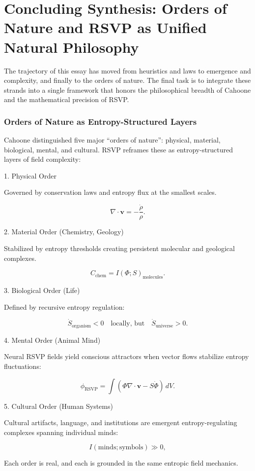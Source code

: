 \documentclass[12pt]{book}
\begin{document}
\chapter{Concluding Synthesis: Orders of Nature and RSVP as Unified Natural Philosophy}
The trajectory of this essay has moved from heuristics and laws to emergence and complexity, and finally to the orders of nature. The final task is to integrate these strands into a single framework that honors the philosophical breadth of Cahoone and the mathematical precision of RSVP.

\subsection{Orders of Nature as Entropy-Structured Layers}
Cahoone distinguished five major “orders of nature”: physical, material, biological, mental, and cultural. RSVP reframes these as entropy-structured layers of field complexity:

1. Physical Order

Governed by conservation laws and entropy flux at the smallest scales.

\[ \nabla \cdot \mathbf{v} = -\frac{\dot{\rho}}{\rho}. \]

2. Material Order (Chemistry, Geology)

Stabilized by entropy thresholds creating persistent molecular and geological complexes.

\[ C_{\text{chem}} = I(\Phi; S)_{\text{molecules}}. \]

3. Biological Order (Life)

Defined by recursive entropy regulation:

\[ \dot{S}_{\text{organism}} < 0 \quad \text{locally, but} \quad \dot{S}_{\text{universe}} > 0. \]

4. Mental Order (Animal Mind)

Neural RSVP fields yield conscious attractors when vector flows stabilize entropy fluctuations:

\[ \phi_{\text{RSVP}} = \int (\Phi \nabla \cdot \mathbf{v} - S \dot{\Phi})\, dV. \]

5. Cultural Order (Human Systems)

Cultural artifacts, language, and institutions are emergent entropy-regulating complexes spanning individual minds:

\[ I(\text{minds}; \text{symbols}) \gg 0, \]

Each order is real, and each is grounded in the same entropic field mechanics.
\end{document}
